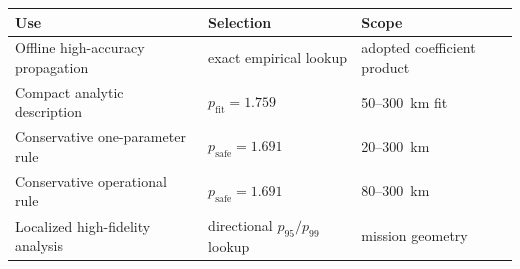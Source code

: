 \begin{tabular}{@{}lll@{}}
\toprule
Use & Selection & Scope \\
\midrule
Offline high-accuracy propagation & exact empirical lookup & adopted coefficient product \\
Compact analytic description & $p_{\mathrm{fit}}=1.759$ & 50--300~km fit \\
Conservative one-parameter rule & $p_{\mathrm{safe}}=1.691$ & 20--300~km \\
Conservative operational rule & $p_{\mathrm{safe}}=1.691$ & 80--300~km \\
Localized high-fidelity analysis & directional $p_{95}/p_{99}$ lookup & mission geometry \\
\bottomrule
\end{tabular}
